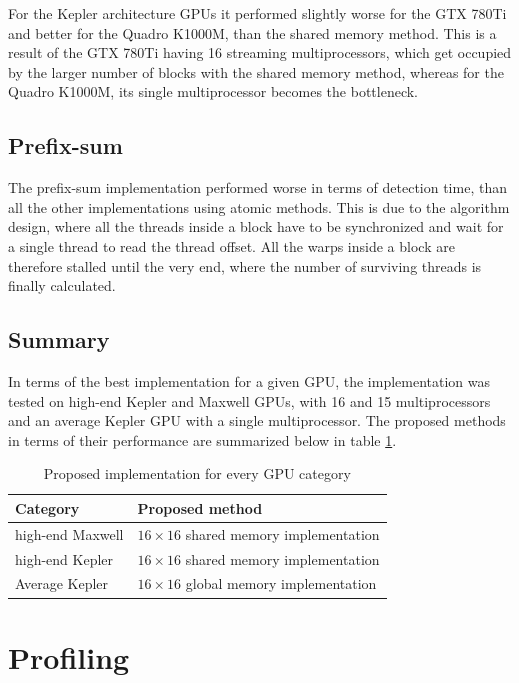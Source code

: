 For the Kepler architecture GPUs it performed slightly worse for the GTX 780Ti and better for the Quadro K1000M, than the shared memory method. This is a result of the GTX 780Ti having 16 streaming multiprocessors, which get occupied by the larger number of blocks with the shared memory method, whereas for the Quadro K1000M, its single multiprocessor becomes the bottleneck.

\subsection{Prefix-sum}

The prefix-sum implementation performed worse in terms of detection time, than all the other implementations using atomic methods. This is due to the algorithm design, where all the threads inside a block have to be synchronized and wait for a single thread to read the thread offset. All the warps inside a block are therefore stalled until the very end, where the number of surviving threads is finally calculated.

\subsection{Summary}

In terms of the best implementation for a given GPU, the implementation was tested on high-end Kepler and Maxwell GPUs, with 16 and 15 multiprocessors and an average Kepler GPU with a single multiprocessor. The proposed methods in terms of their performance are summarized below in table \ref{tab:proposed-methods}.

\begin{table}[htbp]
\centering
\begin{tabular}{| l | l |}
\hline
Category & Proposed method \\
\hline
high-end Maxwell & $16 \times 16$ shared memory implementation \\
\hline
high-end Kepler & $16 \times 16$ shared memory implementation \\
\hline
Average Kepler & $16 \times 16$ global memory implementation \\
\hline
\end{tabular}
\caption{Proposed implementation for every GPU category}
\label{tab:proposed-methods}
\end{table}

\section{Profiling}\label{sec:profiling}

